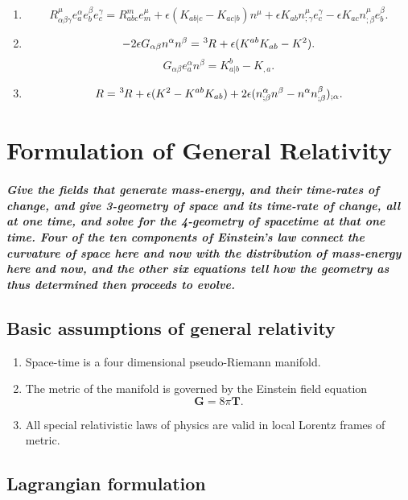 \begin{newthem}
\begin{enumerate}
\item \[R^{\mu}_{\alpha \beta \gamma} e_a^{\alpha} e_b^{\beta} e_c^{\gamma} = R^m_{abc} e_m^{\mu} + \epsilon (K_{ab|c} - K_{ac|b})n^{\mu} + \epsilon K_{ab} n^{\mu}_{;\gamma}e_c^{\gamma} - \epsilon K_{ac} n^{\mu}_{;\beta}e_b^{\beta}.\]
\item \[-2\epsilon G_{\alpha \beta} n^{\alpha} n^{\beta} = \tensor[^3]{R}{} + \epsilon(K^{ab}K_{ab}-K^2).\]
\[G_{\alpha \beta} e_a^{\alpha}n^{\beta} = K^b_{a|b} - K_{,a}.\]
\item \[R = \tensor[^3]{R}{} + \epsilon(K^2-K^{ab}K_{ab}) + 2\epsilon(n^{\alpha}_{;\beta}n^{\beta}-n^{\alpha}n^{\beta}_{;\beta})_{;\alpha}.\]
\end{enumerate}
\end{newthem}

\chapter{Formulation of General Relativity}
\paragraph*{Give the fields that generate mass-energy, and their time-rates of change, and give 3-geometry of space and its time-rate of change, all at one time, and solve for the 4-geometry of spacetime at that one time. Four of the ten components of Einstein's law connect the curvature of space here and now with the distribution of mass-energy here and now, and the other six equations tell how the geometry as thus determined then proceeds to evolve.}

\section{Basic assumptions of general relativity}
\begin{enumerate}
\item Space-time is a four dimensional pseudo-Riemann manifold.
\item The metric of the manifold is governed by the Einstein field equation
\[\bm{G} = 8\pi\bm{T}.\]
\item  All special relativistic laws of physics are valid in local Lorentz frames of metric.
\end{enumerate}

\section{Lagrangian formulation}
